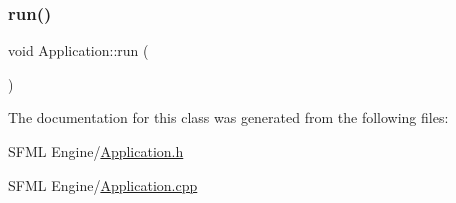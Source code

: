 \subsubsection{\texorpdfstring{run()}{run()}}
{\footnotesize\ttfamily void Application\+::run (\begin{DoxyParamCaption}{ }\end{DoxyParamCaption})}



The documentation for this class was generated from the following files\+:\begin{DoxyCompactItemize}
\item 
S\+F\+M\+L Engine/\hyperlink{_application_8h}{Application.\+h}\item 
S\+F\+M\+L Engine/\hyperlink{_application_8cpp}{Application.\+cpp}\end{DoxyCompactItemize}
